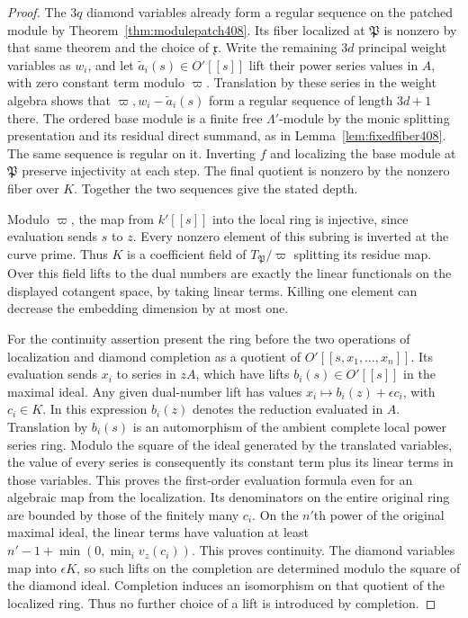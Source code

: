 \documentclass[a4paper,11pt]{article}
\theoremstyle{definition}
\theoremstyle{remark}
\numberwithin{equation}{section}
\begin{document}
\begin{proof}
The \(3q\) diamond variables already form a regular sequence
on the patched module by Theorem~\ref{thm:modulepatch408}.
Its fiber localized at \(\mathfrak P\) is nonzero by that same
theorem and the choice of \(\mathfrak x\). Write the remaining
\(3d\) principal weight variables as \(w_i\), and let
\(\widetilde a_i(s)\in O'[[s]]\) lift their power series values
in \(A\), with zero constant term modulo \(\varpi\). Translation
by these series in the weight algebra shows that
\(\varpi,w_i-\widetilde a_i(s)\) form a regular sequence
of length \(3d+1\) there. The ordered base module is a finite
free \(\Lambda'\)-module by the monic splitting presentation
and its residual direct summand, as in
Lemma~\ref{lem:fixedfiber408}. The same sequence is regular
on it. Inverting \(f\) and localizing the base module at
\(\mathfrak P\) preserve injectivity at each step. The
final quotient is nonzero by the nonzero fiber over \(K\).
Together the two sequences give the stated depth.

Modulo \(\varpi\), the map from \(k'[[s]]\) into the local
ring is injective, since evaluation sends \(s\) to \(z\).
Every nonzero element of this subring is inverted at the
curve prime. Thus \(K\) is a coefficient field of
\(T_{\mathfrak P}/\varpi\) splitting its residue map. Over
this field lifts to the dual numbers are exactly the linear
functionals on the displayed cotangent space, by taking
linear terms. Killing one element can decrease the embedding
dimension by at most one.

For the continuity assertion present the ring before the two
operations of localization and diamond completion as a quotient
of \(O'[[s,x_1,\ldots,x_n]]\). Its evaluation sends \(x_i\)
to series in \(zA\), which have lifts \(b_i(s)\in O'[[s]]\)
in the maximal ideal. Any given dual-number lift has values
\(x_i\mapsto b_i(z)+\epsilon c_i\), with \(c_i\in K\).
In this expression \(b_i(z)\) denotes the reduction evaluated
in \(A\). Translation by \(b_i(s)\) is an automorphism of
the ambient complete local power series ring. Modulo the
square of the ideal generated by the translated variables,
the value of every series is consequently its constant
term plus its linear terms in those variables. This proves
the first-order evaluation formula even for an algebraic
map from the localization. Its denominators on the entire
original ring are bounded by those of the finitely many
\(c_i\). On the \(n'\)th power of the original maximal ideal,
the linear terms have valuation at least
\(n'-1+\min(0,\min_i v_z(c_i))\). This proves continuity.
The diamond variables map into \(\epsilon K\), so such lifts
on the completion are determined modulo the square of the
diamond ideal. Completion induces an isomorphism on that
quotient of the localized ring. Thus no further choice of a
lift is introduced by completion.
\end{proof}
\end{document}
